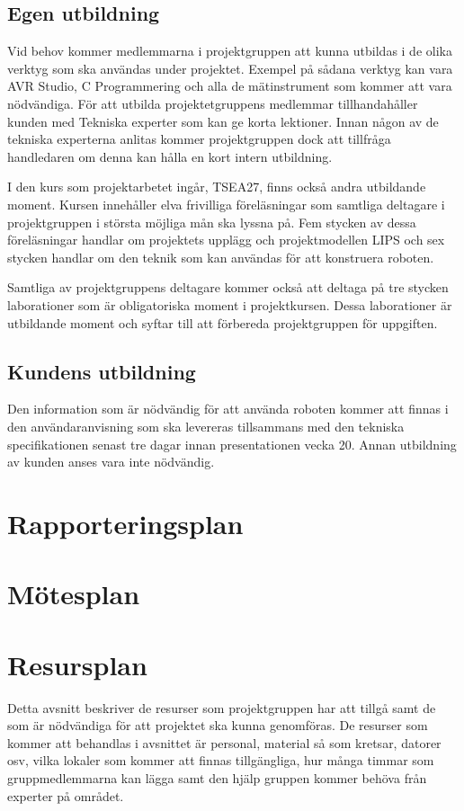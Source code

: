 \documentclass[a4paper,12pt]{article}
\begin{document}
\subsection{Egen utbildning}
Vid behov kommer medlemmarna i projektgruppen att kunna utbildas i de olika verktyg som ska användas under projektet. Exempel på sådana verktyg kan vara AVR Studio, C Programmering och alla de mätinstrument som kommer att vara nödvändiga. För att utbilda projektetgruppens medlemmar tillhandahåller kunden med Tekniska experter som kan ge korta lektioner. Innan någon av de tekniska experterna anlitas kommer projektgruppen dock att tillfråga handledaren om denna kan hålla en kort intern utbildning. 

I den kurs som projektarbetet ingår, TSEA27, finns också andra utbildande moment. Kursen innehåller elva frivilliga föreläsningar som samtliga deltagare i projektgruppen i största möjliga mån ska lyssna på. Fem stycken av dessa föreläsningar handlar om projektets upplägg och projektmodellen LIPS och sex stycken handlar om den teknik som kan användas för att konstruera roboten.

Samtliga av projektgruppens deltagare kommer också att deltaga på tre stycken laborationer som är obligatoriska moment i projektkursen. Dessa laborationer är utbildande moment och syftar till att förbereda projektgruppen för uppgiften.


\subsection{Kundens utbildning}
Den information som är nödvändig för att använda roboten kommer att finnas i den användaranvisning som ska levereras tillsammans med den tekniska specifikationen senast tre dagar innan presentationen vecka 20. Annan utbildning av kunden anses vara inte nödvändig.


\section{Rapporteringsplan}

\section{Mötesplan}

\section{Resursplan}	%
Detta avsnitt beskriver de resurser som projektgruppen har att tillgå samt de som är nödvändiga för att projektet ska kunna genomföras. De resurser som kommer att behandlas i avsnittet är personal, material så som kretsar, datorer osv, vilka lokaler som kommer att finnas tillgängliga, hur många timmar som gruppmedlemmarna kan lägga samt den hjälp gruppen kommer behöva från experter på området. 
\end{document}
